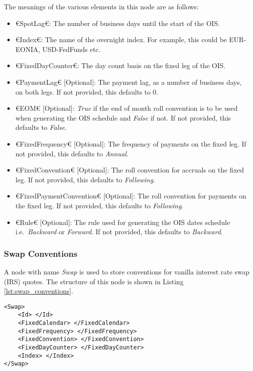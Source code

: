 The meanings of the various elements in this node are as follows:
\begin{itemize}
\item €SpotLag€: The number of business days until the start of the OIS.
\item €Index€: The name of the overnight index. For example, this could be EUR-EONIA, USD-FedFunds etc.
\item €FixedDayCounter€: The day count basis on the fixed leg of the OIS.
\item €PaymentLag€ [Optional]: The payment lag, as a number of business days, on both legs. If not provided, this defaults 
to 0.
\item €EOM€ [Optional]: \emph{True} if the end of month roll convention is to be used when generating the OIS schedule and 
\emph{False} if not. If not provided, this defaults to \emph{False}.
\item €FixedFrequency€ [Optional]: The frequency of payments on the fixed leg. If not provided, this defaults to 
\emph{Annual}.
\item €FixedConvention€ [Optional]: The roll convention for accruals on the fixed leg. If not provided, this defaults to 
\emph{Following}.
\item €FixedPaymentConvention€ [Optional]: The roll convention for payments on the fixed leg. If not provided, this defaults 
to \emph{Following}.
\item €Rule€ [Optional]: The rule used for generating the OIS dates schedule i.e.\ \emph{Backward} or \emph{Forward}. If not 
provided, this defaults to \emph{Backward}.
\end{itemize}

\subsubsection{Swap Conventions}
A node with name \emph{Swap} is used to store conventions for vanilla interest rate swap (IRS) quotes. The structure of 
this node is shown in Listing \ref{lst:swap_conventions}.

\begin{lstlisting}[caption={Swap conventions}, label=lst:swap_conventions]
<Swap>
	<Id> </Id>
	<FixedCalendar> </FixedCalendar>
	<FixedFrequency> </FixedFrequency>
	<FixedConvention> </FixedConvention>
	<FixedDayCounter> </FixedDayCounter>
	<Index> </Index>
</Swap>
\end{lstlisting}

